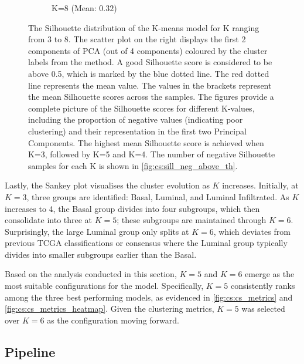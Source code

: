 \begin{figure}[!t]
\begin{subfigure}[!t]{0.49\textwidth}
        \caption{K=8 (Mean: $0.32$)}
    \end{subfigure}
    \centering
    \caption[Silhouette distribution a further exploration of K-means]{The Silhouette distribution of the K-means model for K ranging from 3 to 8. The scatter plot on the right displays the first 2 components of PCA (out of 4 components) coloured by the cluster labels from the method. A good Silhouette score is considered to be above 0.5, which is marked by the blue dotted line. The red dotted line represents the mean value. The values in the brackets represent the mean Silhouette scores across the samples. The figures provide a complete picture of the Silhouette scores for different K-values, including the proportion of negative values (indicating poor clustering) and their representation in the first two Principal Components. The highest mean Silhouette score is achieved when K=3, followed by K=5 and K=4. The number of negative Silhouette samples for each K is shown in \cref{fig:cs:sill_neg_above_th}.}
    \label{fig:cs:sill_distrib}
\end{figure}

Lastly, the Sankey plot visualises the cluster evolution as $K$ increases. Initially, at $K=3$, three groups are identified: Basal, Luminal, and Luminal Infiltrated. As $K$ increases to 4, the Basal group divides into four subgroups, which then consolidate into three at $K=5$; these subgroups are maintained through $K=6$. Surprisingly, the large Luminal group only splits at $K=6$, which deviates from previous TCGA classifications or consensus \citep{Robertson2017-mg, Kamoun2020-tj} where the Luminal group typically divides into smaller subgroups earlier than the Basal.

Based on the analysis conducted in this section, $K=5$ and $K=6$ emerge as the most suitable configurations for the model. Specifically, $K=5$ consistently ranks among the three best performing models, as evidenced in \cref{fig:cs:cs_metrics} and \cref{fig:cs:cs_metrics_heatmap}. Given the clustering metrics, $K=5$ was selected over $K=6$ as the configuration moving forward.





\subsection{Pipeline}

